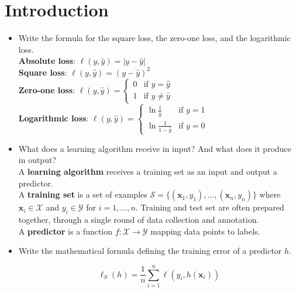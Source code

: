\newpage
\section{Introduction}


\begin{itemize}
    \item Write the formula for the square loss, the zero-one loss, and the logarithmic loss.\\

        \textbf{Absolute loss}: $\ell(y, \hat{y}) = |y-\hat{y}|$\\
        \textbf{Square loss}: $\ell(y, \hat{y}) = (y-\hat{y})^2$\\
        \textbf{Zero-one loss}: $\ell(y, \hat{y}) = \begin{cases} 
            0 & \text{if } y = \hat{y}\\ 
            1 & \text{if } y \neq \hat{y}
        \end{cases}$\\
        \textbf{Logarithmic loss}: $\ell(y, \hat{y}) = \begin{cases} 
            \ln\frac{1}{\hat{y}} & \text{if } y = 1\\ 
            \ln\frac{1}{1-\hat{y}} & \text{if } y = 0 
        \end{cases}$\\

    \item What does a learning algorithm receive in input? And what does it produce in output?\\

        A \textbf{learning algorithm} receives a training set as an input and output a predictor.\\ A \textbf{training set} is a set of examples $\mathcal{S} = \{(\boldsymbol{x}_1, y_1), \dots, (\boldsymbol{x}_n, y_n)\}$ where $\boldsymbol{x}_i \in \mathcal{X}$ and $y_i \in \mathcal{Y}$ for $i = 1, \dots, n$. Training and test set are often prepared together, through a single round of data collection and annotation.\\ A \textbf{predictor} is a function $f: \mathcal{X} \rightarrow \mathcal{Y}$ mapping data points to labels.\\
    
    \item Write the mathematical formula defining the training error of a predictor $h$.

        $$\ell_{S}(h) = \frac{1}{n} \sum_{i=1}^n \ell(y_i, h(\boldsymbol{x}_i))$$


\end{itemize}
